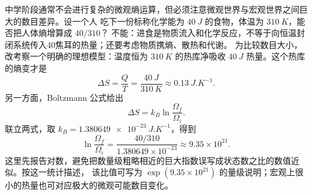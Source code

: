 中学阶段通常不会进行复杂的微观熵运算，但必须注意微观世界与宏观世界之间巨大的数目差异。设一个人
吃下一份标称化学能为 $\SI{40}{J}$ 的食物，体温为 $\SI{310}{K}$，能否把人体熵增算成 $40/310$？
不能：进食是物质流入和化学反应，不等于向恒温封闭系统传入40焦耳的热量；还要考虑物质携熵、散热和代谢。
为比较数目大小，改考察一个明确的理想模型：温度恒为 $\SI{310}{K}$ 的热库净吸收
$\SI{40}{J}$ 热量。这个热库的熵变才是
\[
  \Delta S=\frac{Q}{T}
  =\frac{\SI{40}{J}}{\SI{310}{K}}
  \approx\SI{0.13}{J.K^{-1}}.
\]
另一方面，Boltzmann 公式给出
\[
  \Delta S=k_B\ln\frac{\Omega_f}{\Omega_i}.
\]
联立两式，取 $k_B=\SI{1.380649e-23}{J.K^{-1}}$，得到
\begin{equation}
  \boxed{\ln\frac{\Omega_f}{\Omega_i}
  =\frac{40/310}{1.380649\times10^{-23}}
  \approx9.35\times10^{21}}.
\end{equation}
这里先报告对数，避免把数量级粗略相近的巨大指数误写成状态数之比的数值近似。按这一统计描述，
该比值可写为 $\exp(9.35\times10^{21})$ 的量级说明；宏观上很小的热量也可对应极大的微观可能数目变化。
